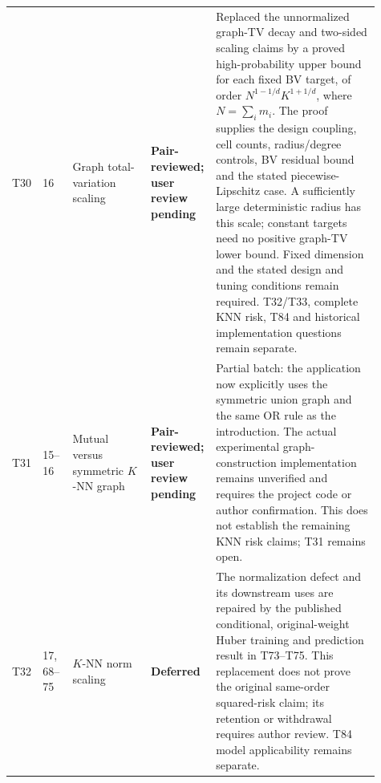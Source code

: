\documentclass[10pt]{article}
\newcommand{\deferred}{\textcolor{deferredred}{\textbf{Deferred}}}
\newcommand{\pairreviewed}{\textcolor{deferredred}{\textbf{Pair-reviewed; user review pending}}}
\begin{document}
\begin{landscape}
\begin{longtable}{L{0.045\linewidth}L{0.08\linewidth}L{0.21\linewidth}L{0.13\linewidth}L{0.445\linewidth}}
T30 & 16 & Graph total-variation scaling & \pairreviewed &
\textcolor{deferredred}{Replaced the unnormalized graph-TV decay and two-sided
scaling claims by a proved high-probability upper bound for each fixed BV
target, of order $N^{1-1/d}K^{1+1/d}$, where $N=\sum_i m_i$.
The proof supplies the design coupling, cell counts, radius/degree controls,
BV residual bound and the stated piecewise-Lipschitz case. A sufficiently
large deterministic radius has this scale; constant targets need no
positive graph-TV lower bound. Fixed dimension and the stated design and
tuning conditions remain required. T32/T33, complete KNN risk, T84 and
historical implementation questions remain separate.}\\
T31 & 15--16 & Mutual versus symmetric $K$-NN graph & \pairreviewed &
\textcolor{deferredred}{Partial batch: the application now explicitly uses
the symmetric union graph and the same OR rule as the introduction.
The actual experimental graph-construction implementation remains
unverified and requires the project code or author confirmation.
This does not establish the remaining KNN risk claims; T31 remains open.}\\
T32 & 17, 68--75 & $K$-NN norm scaling &
\deferred & \textcolor{deferredred}{The normalization defect and its
downstream uses are repaired by the published conditional,
original-weight Huber training and prediction result in T73--T75.
This replacement does not prove the original same-order squared-risk
claim; its retention or withdrawal requires author review.
T84 model applicability remains separate.}\\

\end{longtable}
\end{landscape}
\end{document}
